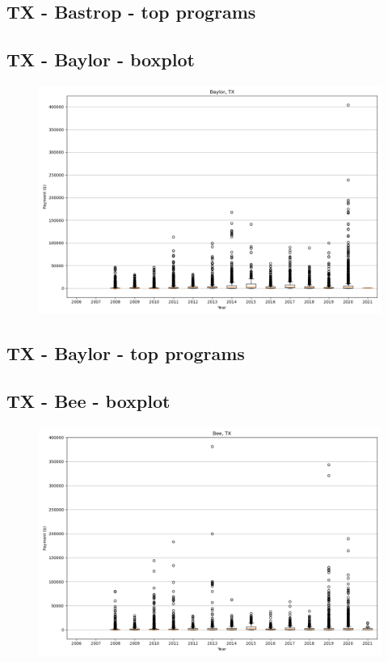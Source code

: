 \subsection*{TX - Bastrop - top programs}

\newpage
\subsection*{TX - Baylor - boxplot}
\begin{figure}[h]
\centering
\includegraphics[width=7in]{../output/boxplots/counties/Baylor-TX_boxplot.png}
\end{figure}


\subsection*{TX - Baylor - top programs}

\newpage
\subsection*{TX - Bee - boxplot}
\begin{figure}[h]
\centering
\includegraphics[width=7in]{../output/boxplots/counties/Bee-TX_boxplot.png}
\end{figure}


